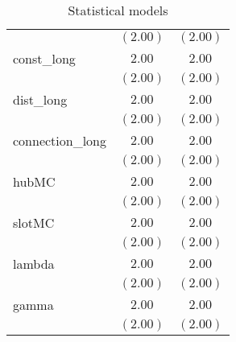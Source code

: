 \begin{table}
\begin{center}
\begin{tabular}{l c c}
                  & $(2.00)$ & $(2.00)$ \\
const\_long       & $2.00$   & $2.00$   \\
                  & $(2.00)$ & $(2.00)$ \\
dist\_long        & $2.00$   & $2.00$   \\
                  & $(2.00)$ & $(2.00)$ \\
connection\_long  & $2.00$   & $2.00$   \\
                  & $(2.00)$ & $(2.00)$ \\
hubMC             & $2.00$   & $2.00$   \\
                  & $(2.00)$ & $(2.00)$ \\
slotMC            & $2.00$   & $2.00$   \\
                  & $(2.00)$ & $(2.00)$ \\
lambda            & $2.00$   & $2.00$   \\
                  & $(2.00)$ & $(2.00)$ \\
gamma             & $2.00$   & $2.00$   \\
                  & $(2.00)$ & $(2.00)$ \\
\hline
\end{tabular}
\caption{Statistical models}
\label{table:coefficients}
\end{center}
\end{table}
